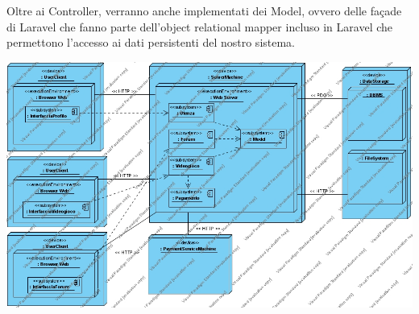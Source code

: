 Oltre ai Controller, verranno anche implementati dei Model, ovvero delle façade di Laravel che fanno parte dell’object relational mapper incluso in Laravel che permettono l’accesso ai dati persistenti del nostro sistema.
\begin{center}
\includegraphics[width=\textwidth,height=\textheight,keepaspectratio]{Figure/Deployment Diagram.jpg}
\end{center}
\newpage

